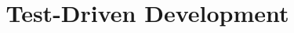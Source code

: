 \documentclass{article}
\begin{document}
\title{Test-Driven Development}
\author{}
\date{}
\maketitle


\end{document}
